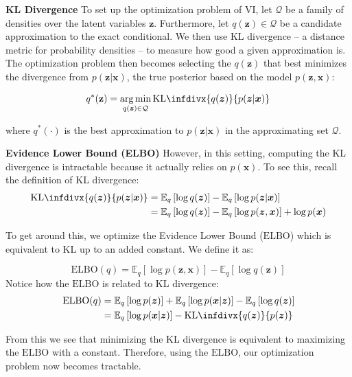 \documentclass[letterpaper,12pt]{article}
\newcommand{\px}{\ensuremath{p(\boldsymbol{x})}}
\newcommand{\pz}{\ensuremath{p(\boldsymbol{z})}}
\newcommand{\pzx}{\ensuremath{p(\boldsymbol{z}, \boldsymbol{x})}}
\newcommand{\pzgivenx}{\ensuremath{p(\boldsymbol{z} | \boldsymbol{x})}}
\newcommand{\pxgivenz}{\ensuremath{p(\boldsymbol{x} | \boldsymbol{z})}}
\newcommand{\qz}{\ensuremath{q(\boldsymbol{z})}}
\newcommand{\z}{\mathbf{z}}
\newcommand{\kld}[2]{\ensuremath{\mathrm{KL}\infdivx{#1}{#2}}\xspace}
\newcommand{\elboq}{\ensuremath{\mathrm{ELBO}(q)}}
\newcommand{\elbo}{\ensuremath{\mathrm{ELBO}}}
\newcommand{\E}{\mathbb{E}_q}
\newcommand{\el}{\left[} %
\newcommand{\er}{\right]} %
\DeclareMathOperator*{\argmin}{arg\,min}
\begin{document}
\textbf{KL Divergence} To set up the optimization problem of VI, let $\mathcal{Q}$ be a family of densities over the latent variables $\z$. Furthermore, let $q(\z) \in \mathcal{Q}$ be a candidate approximation to the exact conditional. We then use KL divergence -- a distance metric for probability densities -- to measure how good a given approximation is. The optimization problem then becomes selecting the $\qz$ that best minimizes the divergence from \pzgivenx, the true posterior based on the model $\pzx$: 

\begin{equation}
q^*(\z) = \argmin_{\qz \in \mathcal{Q}} \kld{\qz}{\pzgivenx}
\end{equation}

where $q^*(\cdot)$ is the best approximation to $\pzgivenx$ in the approximating set $\mathcal{Q}$.

\textbf{Evidence Lower Bound (ELBO)} However, in this setting, computing the KL divergence is intractable because it actually relies on \px. To see this, recall the definition of KL divergence:
\begin{equation} \label{eq:kl def}
\begin{split}
    \kld{\qz}{\pzgivenx} &= \E \left[\log \qz \right] - \E \left[ \log \pzgivenx \right]\\
    &= \E \left[ \log \qz \right] - \E \left[ \log \pzx \right] + \log \px
\end{split}
\end{equation}

To get around this, we optimize the Evidence Lower Bound (\elbo) which is equivalent to KL up to an added constant. We define it as: 

\begin{equation} \label{eq:elbo def}
    \elboq =\E\left[ \log \pzx \right] - \E \left[ \log \qz \right]
\end{equation}
\noindent Notice how the $\elbo$ is related to KL divergence:
\begin{equation}
\begin{split}
    \elboq &= \E \el \log \pz \er + \E \el \log \pxgivenz \er - \E \el \log \qz \er\\
    &= \E \el \log \pxgivenz \er - \kld{\qz}{\pz}
\end{split}
\end{equation}

\noindent From this we see that minimizing the KL divergence is equivalent to maximizing the $\elbo$ with a constant. Therefore, using the \elbo, our optimization problem now becomes tractable.
\end{document}
